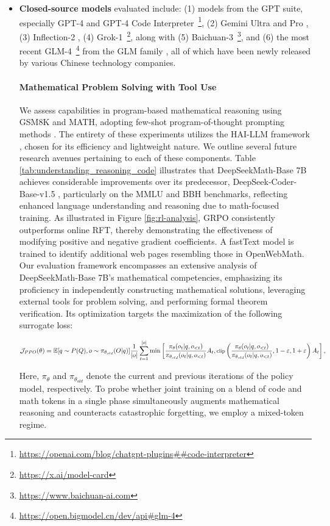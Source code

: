 \begin{itemize}[topsep=0pt]
    \item \textbf{Closed-source models} evaluated include: (1) models from the GPT suite, especially GPT-4 \citep{gpt4} and GPT-4 Code Interpreter~\footnote{\url{https://openai.com/blog/chatgpt-plugins\#\#code-interpreter}}, (2) Gemini Ultra and Pro \citep{gemini}, (3) Inflection-2 \citep{inflection-2}, (4) Grok-1~\footnote{\url{https://x.ai/model-card}}, along with (5) Baichuan-3~\footnote{\url{https://www.baichuan-ai.com}}, and (6) the most recent GLM-4~\footnote{\url{https://open.bigmodel.cn/dev/api\#glm-4}} from the GLM family \citep{glm}, all of which have been newly released by various Chinese technology companies. \paragraph{Mathematical Problem Solving with Tool Use}  
We assess capabilities in program-based mathematical reasoning using GSM8K and MATH, adopting few-shot program-of-thought prompting methods \citep{pot,pal}. The entirety of these experiments utilizes the HAI-LLM framework \citep{haillm}, chosen for its efficiency and lightweight nature. We outline several future research avenues pertaining to each of these components. Table \ref{tab:understanding_reasoning_code} illustrates that DeepSeekMath-Base 7B achieves considerable improvements over its predecessor, DeepSeek-Coder-Base-v1.5 \citep{deepseek-coder}, particularly on the MMLU and BBH benchmarks, reflecting enhanced language understanding and reasoning due to math-focused training. As illustrated in Figure \ref{fig:rl-analysis}, GRPO consistently outperforms online RFT, thereby demonstrating the effectiveness of modifying positive and negative gradient coefficients. A fastText model \citep{joulin2016fasttext} is trained to identify additional web pages resembling those in OpenWebMath. Our evaluation framework encompasses an extensive analysis of DeepSeekMath-Base 7B’s mathematical competencies, emphasizing its proficiency in independently constructing mathematical solutions, leveraging external tools for problem solving, and performing formal theorem verification. Its optimization targets the maximization of the following surrogate loss:

\begin{equation}
\footnotesize
                \mathcal{J}_{PPO}(\theta) = \mathbb{E}{[q \sim P(Q), o \sim \pi_{\theta_{old}}(O|q)]} \frac{1}{|o|} \sum_{t=1}^{|o|} \min \left[ \frac{\pi_\theta(o_{t} | q, o_{<t})}{\pi_{\theta_{old}}(o_{t} | q, o_{<t})} A_{t}, \text{clip} \left( \frac{\pi_\theta(o_{t} | q, o_{<t})}{\pi_{\theta_{old}}(o_{t} | q, o_{<t})}, 1 - \varepsilon, 1 + \varepsilon \right)  A_{t} \right] ,
\end{equation}

Here, $\pi_{\theta}$ and $\pi_{\theta_{old}}$ denote the current and previous iterations of the policy model, respectively. To probe whether joint training on a blend of code and math tokens in a single phase simultaneously augments mathematical reasoning and counteracts catastrophic forgetting, we employ a mixed-token regime. \end{itemize}

